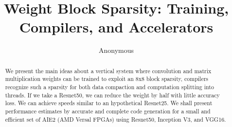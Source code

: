 \documentclass[sigconf]{acmart}
\begin{document}
\title{Weight Block Sparsity: Training, Compilers, and Accelerators}

\author{Anonymous} 

\renewcommand{\shortauthors}{ Anonymous  et al.}

\begin{abstract}
We present the main ideas about a vertical system where convolution
and matrix multiplication weights can be trained to exploit an 8x8
block sparsity, compilers recognize such a sparsity for both data
compaction and computation splitting into threads. If we take a
Resnet50, we can reduce the weight by half with little accuracy
loss. We can achieve speeds similar to an hypothetical Resnet25. We
shall present performance estimates by accurate and complete code
generation for a small and efficient set of AIE2 (AMD Versal FPGAs)
using Resnet50, Inception V3, and VGG16.
\end{abstract}



\end{document}
